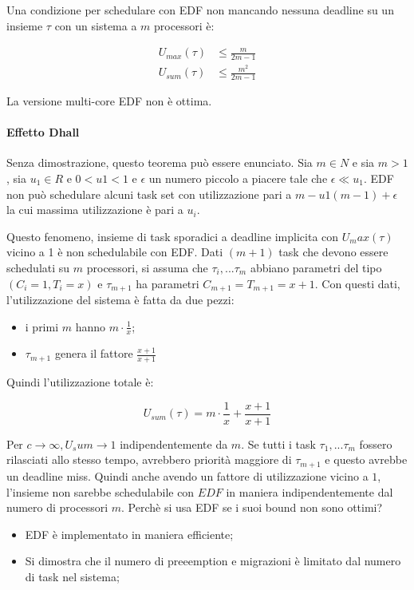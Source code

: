 \documentclass[11pt,a4paper]{report}
\begin{document}
Una condizione per schedulare con EDF non mancando nessuna deadline su un insieme $\tau$ con un sistema a $m$ processori è:

\begin{align}
    U_{max}(\tau) &\leq \frac{m}{2m-1} \\
    U_{sum}(\tau) &\leq \frac{m^2}{2m-1}
\end{align}

La versione multi-core EDF non è ottima.

\paragraph{Effetto Dhall} Senza dimostrazione, questo teorema può essere enunciato. Sia $m \in N$ e sia $m > 1$, sia $u_1 \in R$ e $0 < u1 < 1$ e $\epsilon$ un numero piccolo a piacere tale che $\epsilon \ll u_1$. EDF non può schedulare alcuni task set con utilizzazione pari a $m - u1(m - 1) + \epsilon$ la cui massima utilizzazione è pari a $u_i$.

Questo fenomeno, insieme di task sporadici a deadline implicita con $U_max(\tau)$ vicino a 1 è non schedulabile con EDF. Dati $(m+1)$ task che devono essere schedulati su $m$ processori, si assuma che $\tau_i,...\tau_m$ abbiano parametri del tipo $(C_i=1, T_i = x)$ e $\tau_{m+1}$ ha parametri $C_{m+1} = T_{m+1}=x+1$. Con questi dati, l'utilizzazione del sistema è fatta da due pezzi:

\begin{itemize}
    \item i primi $m$ hanno $m \cdot \frac{1}{x}$;
    \item $\tau_{m+1}$ genera il fattore $\frac{x+1}{x+1}$
\end{itemize}
Quindi l'utilizzazione totale è:

\begin{equation}
    U_{sum}(\tau) = m \cdot \frac{1}{x} +\frac{x+1}{x+1}
\end{equation}

Per $c \to \infty, U_sum \to 1$ indipendentemente da $m$. Se tutti i task $\tau_1,...\tau_m$ fossero rilasciati allo stesso tempo, avrebbero priorità maggiore di $\tau_{m+1}$ e questo avrebbe un deadline miss. Quindi anche avendo un fattore di utilizzazione vicino a $1$, l'insieme non sarebbe schedulabile con $EDF$ in maniera indipendentemente dal numero di processori $m$. Perchè si usa EDF se i suoi bound non sono ottimi?
\begin{itemize}
    \item EDF è implementato in maniera efficiente;
    \item Si dimostra che il numero di preeemption e migrazioni è limitato dal numero di task nel sistema;
\end{itemize}
\end{document}
